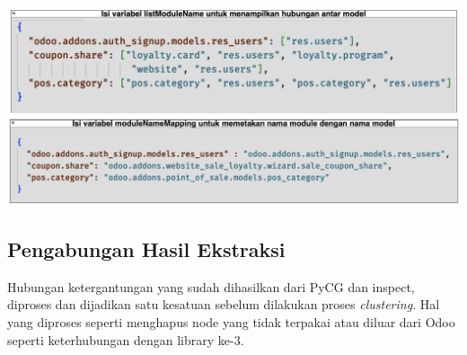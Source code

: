 \begin{center}
	\includegraphics[width=14cm]{img/bab_4/def_inspect_4.png}
	\label{fig:def_inspect_4}
\end{center}

\subsection{Pengabungan Hasil Ekstraksi}
Hubungan ketergantungan yang sudah dihasilkan dari PyCG dan inspect, diproses dan dijadikan satu kesatuan sebelum dilakukan proses \textit{clustering}. Hal yang diproses seperti menghapus node yang tidak terpakai atau diluar dari Odoo seperti keterhubungan dengan library ke-3.  

